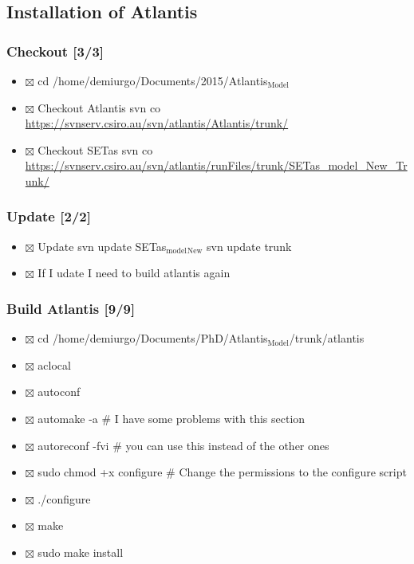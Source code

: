 \documentclass[11pt]{article}
\begin{document}
\subsection*{Installation of Atlantis}
\label{sec-1-2}
\subsubsection*{Checkout [3/3]}
\label{sec-1-2-1}

\begin{itemize}
\item $\boxtimes$ cd  /home/demiurgo/Documents/2015/Atlantis$_{\mathrm{Model}}$
\item $\boxtimes$ Checkout Atlantis
  svn co  \href{https://svnserv.csiro.au/svn/atlantis/Atlantis/trunk/}{https://svnserv.csiro.au/svn/atlantis/Atlantis/trunk/}
\item $\boxtimes$ Checkout SETas
  svn co  \href{https://svnserv.csiro.au/svn/atlantis/runFiles/trunk/SETas_model_New_Trunk/}{https://svnserv.csiro.au/svn/atlantis/runFiles/trunk/SETas\_model\_New\_Trunk/}
\end{itemize}
\subsubsection*{Update [2/2]}
\label{sec-1-2-2}

\begin{itemize}
\item $\boxtimes$ Update
    svn update SETas$_{\mathrm{model}}$$_{\mathrm{New}}$
    svn update trunk
\item $\boxtimes$ If I udate I need to build atlantis again
\end{itemize}
\subsubsection*{Build Atlantis [9/9]}
\label{sec-1-2-3}

\begin{itemize}
\item $\boxtimes$ cd  /home/demiurgo/Documents/PhD/Atlantis$_{\mathrm{Model}}$/trunk/atlantis
\item $\boxtimes$ aclocal
\item $\boxtimes$ autoconf
\item $\boxtimes$ automake -a               \# I have some problems with this section
\item $\boxtimes$ autoreconf  -fvi          \# you can use this instead of the other ones
\item $\boxtimes$ sudo chmod +x configure   \# Change the permissions to the configure script
\item $\boxtimes$ ./configure
\item $\boxtimes$ make
\item $\boxtimes$ sudo make install
\end{itemize}
\end{document}
